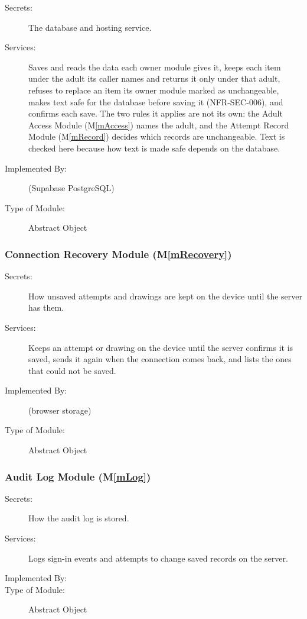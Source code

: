 \documentclass[12pt, titlepage]{article}
\newcommand{\mref}[1]{M\ref{#1}}
\begin{document}
\begin{description}
\item[Secrets:] The database and hosting service.
\item[Services:] Saves and reads the data each owner module gives it, keeps
  each item under the adult its caller names and returns it only under that
  adult, refuses to replace an item its owner module marked as unchangeable,
  makes text safe for the database before saving it (NFR-SEC-006), and
  confirms each save. The two rules it applies are not its own: the Adult
  Access Module (\mref{mAccess}) names the adult, and the Attempt Record
  Module (\mref{mRecord}) decides which records are unchangeable. Text is
  checked here because how text is made safe depends on the database.
\item[Implemented By:] \progname{} (Supabase PostgreSQL)
\item[Type of Module:] Abstract Object
\end{description}

\subsubsection{Connection Recovery Module (\mref{mRecovery})}

\begin{description}
\item[Secrets:] How unsaved attempts and drawings are kept on the device until
  the server has them.
\item[Services:] Keeps an attempt or drawing on the device until the server
  confirms it is saved, sends it again when the connection comes back, and lists
  the ones that could not be saved.
\item[Implemented By:] \progname{} (browser storage)
\item[Type of Module:] Abstract Object
\end{description}

\subsubsection{Audit Log Module (\mref{mLog})}

\begin{description}
\item[Secrets:] How the audit log is stored.
\item[Services:] Logs sign-in events and attempts to change saved records on the
  server.
\item[Implemented By:] \progname{}
\item[Type of Module:] Abstract Object
\end{description}
\end{document}
